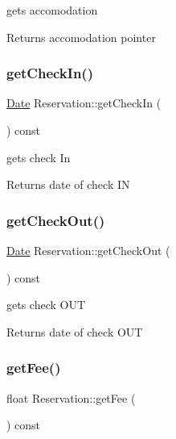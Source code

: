 gets accomodation 

\begin{DoxyReturn}{Returns}
accomodation pointer 
\end{DoxyReturn}
\hypertarget{class_reservation_a1a2bec76e916f0bdeedd036093cace9a}{}\label{class_reservation_a1a2bec76e916f0bdeedd036093cace9a} 
\subsubsection{\texorpdfstring{get\+Check\+In()}{getCheckIn()}}
{\footnotesize\ttfamily \hyperlink{class_date}{Date} Reservation\+::get\+Check\+In (\begin{DoxyParamCaption}{ }\end{DoxyParamCaption}) const\hspace{0.3cm}{\ttfamily [inline]}}



gets check In 

\begin{DoxyReturn}{Returns}
date of check IN 
\end{DoxyReturn}
\hypertarget{class_reservation_a74820e32522fcd81b643954314202513}{}\label{class_reservation_a74820e32522fcd81b643954314202513} 
\subsubsection{\texorpdfstring{get\+Check\+Out()}{getCheckOut()}}
{\footnotesize\ttfamily \hyperlink{class_date}{Date} Reservation\+::get\+Check\+Out (\begin{DoxyParamCaption}{ }\end{DoxyParamCaption}) const\hspace{0.3cm}{\ttfamily [inline]}}



gets check O\+UT 

\begin{DoxyReturn}{Returns}
date of check O\+UT 
\end{DoxyReturn}
\hypertarget{class_reservation_a5d2e10ceb53e119bede30b6e36d39f4d}{}\label{class_reservation_a5d2e10ceb53e119bede30b6e36d39f4d} 
\subsubsection{\texorpdfstring{get\+Fee()}{getFee()}}
{\footnotesize\ttfamily float Reservation\+::get\+Fee (\begin{DoxyParamCaption}{ }\end{DoxyParamCaption}) const}



